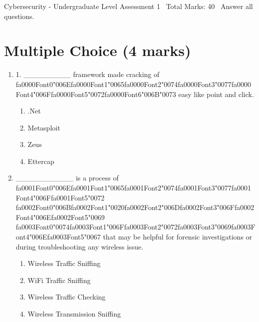 \documentclass[12pt]{article}
\begin{document}
\begin{center}
Cybersecurity - Undergraduate Level Assessment 1 \
Total Marks: 40 \
Answer all questions.
\end{center}

\section*{Multiple Choice (4 marks)}
\begin{enumerate}[label=\arabic*.]
\item 1. \_\_\_\_\_\_\_\_\_ framework made cracking of {\csname fa0000Font0\endcsname\char"006E}{\csname fa0000Font1\endcsname\char"0065}{\csname fa0000Font2\endcsname\char"0074}{\csname fa0000Font3\endcsname\char"0077}{\csname fa0000Font4\endcsname\char"006F}{\csname fa0000Font5\endcsname\char"0072}{\csname fa0000Font6\endcsname\char"006B}{\char"0073} easy like point and click.
\begin{enumerate}[label=(\alph*)]
    \item .Net
    \item Metasploit
    \item Zeus
    \item Ettercap
\end{enumerate}
\item \_\_\_\_\_\_\_\_\_\_\_ is a process of {\csname fa0001Font0\endcsname\char"006E}{\csname fa0001Font1\endcsname\char"0065}{\csname fa0001Font2\endcsname\char"0074}{\csname fa0001Font3\endcsname\char"0077}{\csname fa0001Font4\endcsname\char"006F}{\csname fa0001Font5\endcsname\char"0072} {\csname fa0002Font0\endcsname\char"006B}{\csname fa0002Font1\endcsname\char"0020}{\csname fa0002Font2\endcsname\char"006D}{\csname fa0002Font3\endcsname\char"006F}{\csname fa0002Font4\endcsname\char"006E}{\csname fa0002Font5\endcsname\char"0069} {\csname fa0003Font0\endcsname\char"0074}{\csname fa0003Font1\endcsname\char"006F}{\csname fa0003Font2\endcsname\char"0072}{\csname fa0003Font3\endcsname\char"0069}{\csname fa0003Font4\endcsname\char"006E}{\csname fa0003Font5\endcsname\char"0067} that may be helpful for forensic investigations or during troubleshooting any wireless issue.
\begin{enumerate}[label=(\alph*)]
    \item Wireless Traffic Sniffing
    \item WiFi Traffic Sniffing
    \item Wireless Traffic Checking
    \item Wireless Transmission Sniffing
\end{enumerate}
\end{enumerate}
\end{document}
